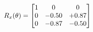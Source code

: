 \documentclass[preview]{standalone}
\begin{document}
\begin{align*}
\special{dvisvgm:raw <g id='unique000'>}R_{x}(\theta) = \begin{bmatrix}1 & 0 & 0 \\0 & -0.50 & +0.87 \\0 & -0.87 & -0.50\end{bmatrix}\special{dvisvgm:raw </g>}
\end{align*}
\end{document}
